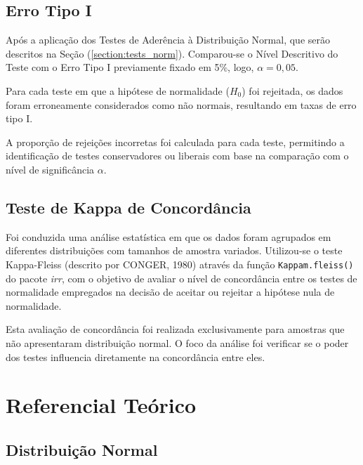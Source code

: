\documentclass[a4paper,11pt]{article} %
\begin{document}




\subsection{Erro Tipo I}
Após a aplicação dos Testes de Aderência à Distribuição Normal, que serão descritos na Seção (\ref{section:tests_norm}). Comparou-se o Nível Descritivo do Teste com o Erro Tipo I previamente fixado em 5\%, logo, $\alpha = 0,05$.\vskip0.3cm

Para cada teste em que a hipótese de normalidade ($H_0$) foi rejeitada, os dados foram erroneamente considerados como não normais, resultando em taxas de erro tipo I. \vskip0.3cm

A proporção de rejeições incorretas foi calculada para cada teste, permitindo a identificação de testes conservadores ou liberais com base na comparação com o nível de significância $\alpha$.

\subsection{Teste de Kappa de Concordância}
Foi conduzida uma análise estatística em que os dados foram agrupados em diferentes distribuições com tamanhos de amostra variados. Utilizou-se o teste Kappa-Fleiss (descrito por CONGER, 1980) através da função \texttt{Kappam.fleiss()} do pacote \textit{irr}, com o objetivo de avaliar o nível de concordância entre os testes de normalidade empregados na decisão de aceitar ou rejeitar a hipótese nula de normalidade. \vskip0.3cm

Esta avaliação de concordância foi realizada exclusivamente para amostras que não apresentaram distribuição normal. O foco da análise foi verificar se o poder dos testes influencia diretamente na concordância entre eles.


\section{Referencial Teórico}
\subsection{Distribuição Normal}
\end{document}
